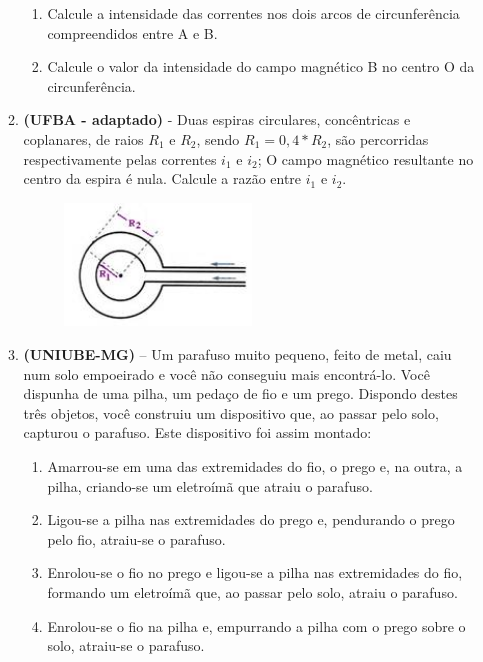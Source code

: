 \documentclass[12pt,letterpaper,fleqn]{article}
\begin{document}
\begin{itemize}
\begin{enumerate}
             \begin{enumerate}
                 \item Calcule a intensidade das correntes nos dois arcos de circunferência compreendidos entre A e B.
                 \item Calcule o valor da intensidade do campo magnético B no centro O da circunferência.
             \end{enumerate}
             
             \item \textbf{(UFBA - adaptado)} - Duas espiras circulares, concêntricas e coplanares, de raios $R_1$ e $R_2$, sendo $R_1=0,4*R_2$, são percorridas respectivamente pelas correntes $i_1$ e $i_2$; O campo magnético resultante no centro da espira é nula. Calcule a razão entre $i_1$ e $i_2$.
             
             \begin{figure}[h]
                 \centering
                 \includegraphics[width=0.5\textwidth]{ex_8.jpg}
             \end{figure}
             \pagebreak
             
             \item \textbf{(UNIUBE-MG)} – Um parafuso muito pequeno, feito de metal, caiu num solo empoeirado e você não conseguiu mais encontrá-lo. Você dispunha de uma pilha, um pedaço de fio e um prego. Dispondo destes três objetos, você construiu um dispositivo que, ao passar pelo solo, capturou o parafuso. Este dispositivo foi assim montado:
             
             \begin{enumerate}
                 \item Amarrou-se em uma das extremidades do fio, o prego e, na outra, a pilha, criando-se um eletroímã que atraiu o parafuso.
                 \item Ligou-se a pilha nas extremidades do prego e, pendurando o prego pelo fio, atraiu-se o parafuso.
                 \item Enrolou-se o fio no prego e ligou-se a pilha nas extremidades do fio, formando um eletroímã que, ao passar pelo solo, atraiu o parafuso.
                 \item Enrolou-se o fio na pilha e, empurrando a pilha com o prego sobre o solo, atraiu-se o parafuso.
             \end{enumerate}
             

\end{enumerate}
\end{itemize}
\end{document}
